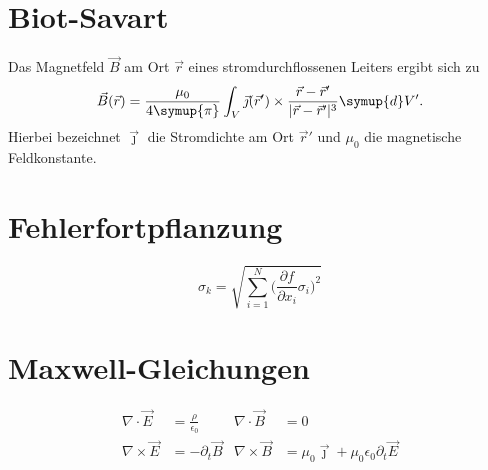 \documentclass{scrartcl}
\begin{document}
\section{Biot-Savart}
  Das Magnetfeld $\vec{B}$ am Ort $\vec{r}$ eines
  stromdurchflossenen Leiters
  ergibt sich zu
\begin{equation}
  \vec{B}(\vec{r})= \frac{\mu_0}%
  {4\symup{\pi}}%
  \int_V \vec{\jmath}(\vec{r}') \times \frac{\vec{r}-\vec{r}'}
  {\lvert \vec{r} - \vec{r}'\rvert^3}
  \symup{d}V'.
\end{equation}
Hierbei bezeichnet $\vec{\jmath}$ die Stromdichte am Ort $\vec{r}'$
 und $\mu_0$ die magnetische Feldkonstante.

 \section{Fehlerfortpflanzung}
 \begin{equation}
\sigma_k = \sqrt{\sum_{i=1}^N \Biggl(\frac{\partial{f}}{\partial{x_i}}
\sigma_i\Biggr)^2}
 \end{equation}

 \section{Maxwell-Gleichungen}
 \begin{align}
\nabla\cdot\vec{E} &= \frac{\rho}{\epsilon_0} &
\nabla\cdot\vec{B} &= 0 \\ %
\nabla\times\vec{E} &= -\partial_t{\vec{B}} &
\nabla\times\vec{B} &= \mu_0\vec{\jmath} + \mu_0\epsilon_0\partial_t{\vec{E}}
 \end{align}
\end{document}
